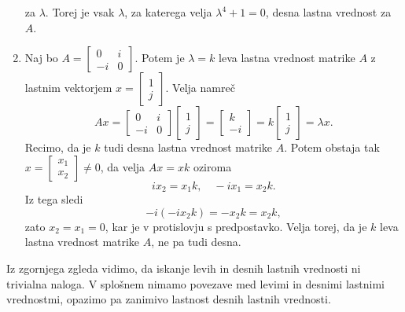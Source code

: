 \documentclass[mat1, tisk]{fmfdelo}
\numberwithin{equation}{section}
\begin{document}
\begin{zgled}
\begin{enumerate}
        za \(\lambda\). Torej je vsak \(\lambda\), za katerega velja \(\lambda^4+1=0\), desna lastna vrednost za $A$.
        \item Naj bo
        $A =
            \begin{bmatrix}
                0 & i \\
                -i & 0
            \end{bmatrix}
        $.
        Potem je $\lambda = k$ leva lastna vrednost matrike $A$ z lastnim vektorjem $x= \begin{bmatrix} 1 \\ j \end{bmatrix}$. Velja namreč
        \begin{equation*}
            Ax =
            \begin{bmatrix}
                0 & i \\
                -i & 0
            \end{bmatrix}
            \begin{bmatrix}
                1 \\
                j
            \end{bmatrix}
            =
            \begin{bmatrix}
                k \\
                -i
            \end{bmatrix} 
            =
            k
            \begin{bmatrix}
                1 \\
                j
            \end{bmatrix}
            =
            \lambda x.
        \end{equation*}
        Recimo, da je $k$ tudi desna lastna vrednost matrike $A$. Potem obstaja tak 
        \(x= \begin{bmatrix} x_1 \\ x_2 \end{bmatrix} \neq 0\), da velja
        $Ax = xk$
        oziroma
        $$i x_2 = x_1 k, \quad
                -i x_1 = x_2 k.$$
        Iz tega sledi
        $$-i(-ix_2k) = -x_2 k = x_2 k,$$
        zato $x_2 = x_1 = 0$, kar je v protislovju s predpostavko. Velja torej, da je $k$ leva lastna vrednost matrike $A$, ne pa tudi desna.
    \end{enumerate}
\end{zgled}

Iz zgornjega zgleda vidimo, da iskanje levih in desnih lastnih vrednosti ni trivialna naloga. V splošnem nimamo povezave
med levimi in desnimi lastnimi vrednostmi, opazimo pa zanimivo lastnost desnih lastnih vrednosti. 
\end{document}
